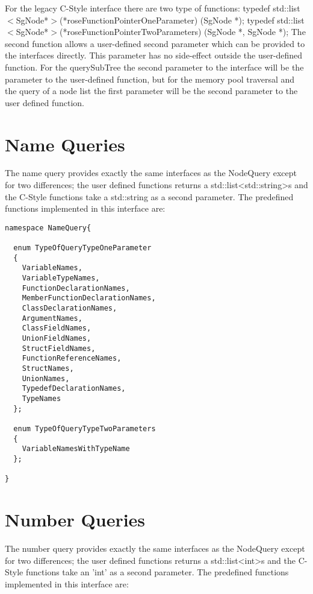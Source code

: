 For the legacy C-Style interface there are two type of functions:
  typedef std::list $<$SgNode*$>$(*roseFunctionPointerOneParameter) (SgNode *);
  typedef std::list $<$SgNode*$>$(*roseFunctionPointerTwoParameters) (SgNode *, SgNode *);
The second function allows a user-defined second parameter which  can be
provided to the interfaces directly. This parameter has no side-effect outside
the user-defined function. For the querySubTree the second parameter to the interface 
will be the parameter to the user-defined function, but for the memory pool
traversal and the query of a node list the first parameter will be the second
parameter to the user defined function.



\section{Name Queries}

The name query provides exactly the same interfaces as the NodeQuery except
for two differences; the user defined functions returns a
std::list<std::string>s and the C-Style functions take a std::string as a
second parameter. The predefined functions implemented in this interface are:

{\mySmallFontSize
\begin{verbatim}
namespace NameQuery{

  enum TypeOfQueryTypeOneParameter
  {
    VariableNames,
    VariableTypeNames,
    FunctionDeclarationNames,
    MemberFunctionDeclarationNames,
    ClassDeclarationNames,
    ArgumentNames,
    ClassFieldNames,
    UnionFieldNames,
    StructFieldNames,
    FunctionReferenceNames,
    StructNames,
    UnionNames,
    TypedefDeclarationNames,
    TypeNames
  };

  enum TypeOfQueryTypeTwoParameters
  {
    VariableNamesWithTypeName
  };

}
\end{verbatim}
}

\section{Number Queries}

The number query provides exactly the same interfaces as the NodeQuery except
for two differences; the user defined functions returns a
std::list<int>s and the C-Style functions take an 'int' as a
second parameter. The predefined functions implemented in this interface are:


